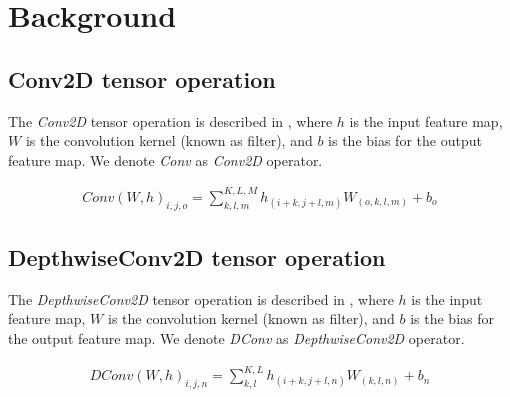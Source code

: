 \section{Background}
\label{sec:background}
\subsection{Conv2D tensor operation}
The \emph{Conv2D} tensor operation is described in , where $h$ is the input feature map, $W$ is the convolution kernel (known as filter), and $b$ is the bias for the output feature map\cite{goodfellow2016deep}. We denote \emph{Conv} as \emph{Conv2D} operator.

\begin{eqnarray} \label{eq:conv2D}
Conv\left(W,h\right)_{i,j,o}=\sum_{k,l,m}^{K,L,M} h_{(i+k,j+l,m)} W_{(o,k,l,m)}+b_{o}
\end{eqnarray} 	
 	
\subsection{DepthwiseConv2D tensor operation}
The \emph{DepthwiseConv2D} tensor operation is described in , where $h$ is the input feature map, $W$ is the convolution kernel (known as filter), and $b$ is the bias for the output feature map. We denote \emph{DConv} as \emph{DepthwiseConv2D} operator.

\begin{eqnarray} \label{eq:dconv2D}
DConv\left(W,h\right)_{i,j,n}=\sum_{k,l}^{K,L} h_{(i+k,j+l,n)} W_{(k,l,n)}+b_{n}
\end{eqnarray}